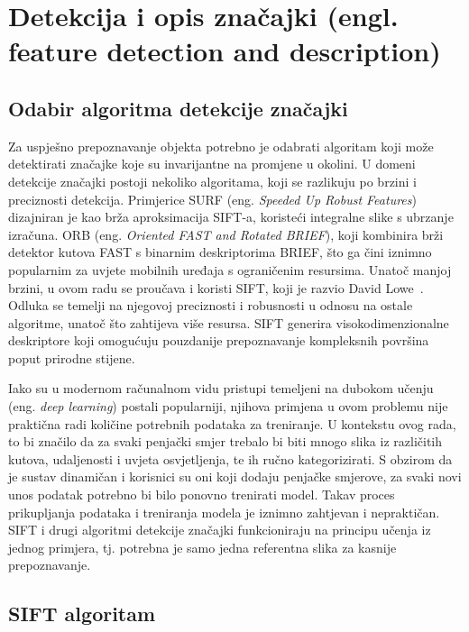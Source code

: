 \section{Detekcija i opis značajki (engl. feature detection and description)}

\subsection{Odabir algoritma detekcije značajki}

Za uspješno prepoznavanje objekta potrebno je odabrati algoritam koji može detektirati značajke koje su invarijantne na promjene u okolini. U domeni detekcije značajki postoji nekoliko algoritama, koji se razlikuju po brzini i preciznosti detekcija. Primjerice SURF (eng. \textit{Speeded Up Robust Features}) dizajniran je kao brža aproksimacija SIFT-a, koristeći integralne slike s ubrzanje izračuna. ORB (eng. \textit{Oriented FAST and Rotated BRIEF}), koji kombinira brži detektor kutova FAST s binarnim deskriptorima BRIEF, što ga čini iznimno popularnim za uvjete mobilnih uređaja s ograničenim resursima. Unatoč manjoj brzini, u ovom radu se proučava i koristi SIFT, koji je razvio David Lowe~\cite{lowe2004sift}. Odluka se temelji na njegovoj preciznosti i robusnosti u odnosu na ostale algoritme, unatoč što zahtijeva više resursa. SIFT generira visokodimenzionalne deskriptore koji omogućuju pouzdanije prepoznavanje kompleksnih površina poput prirodne stijene. 

Iako su u modernom računalnom vidu pristupi temeljeni na dubokom učenju (eng. \textit{deep learning}) postali popularniji, njihova primjena u ovom problemu nije praktična radi količine potrebnih podataka za treniranje. U kontekstu ovog rada, to bi značilo da za svaki penjački smjer trebalo bi biti mnogo slika iz različitih kutova, udaljenosti i uvjeta osvjetljenja, te ih ručno kategorizirati. S obzirom da je sustav dinamičan i korisnici su oni koji dodaju penjačke smjerove, za svaki novi unos podatak potrebno bi bilo ponovno trenirati model. Takav proces prikupljanja podataka i treniranja modela je iznimno zahtjevan i nepraktičan. SIFT i drugi algoritmi detekcije značajki funkcioniraju na principu učenja iz jednog primjera, tj. potrebna je samo jedna referentna slika za kasnije prepoznavanje. 

\subsection{SIFT algoritam}

